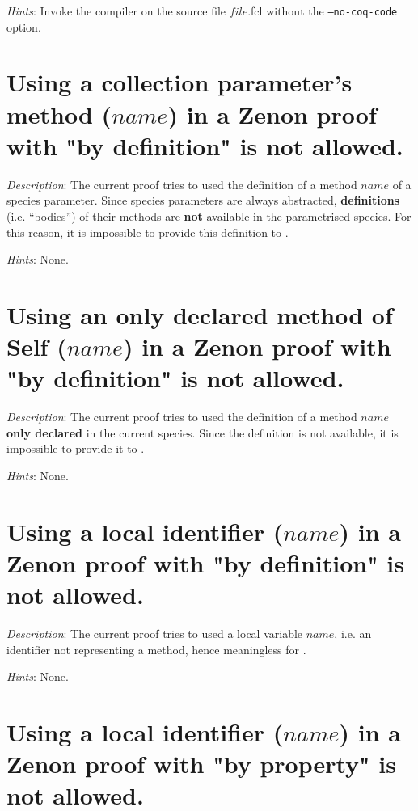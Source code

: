 {\em Hints}: Invoke the compiler on the source file $file$.fcl without
the {\tt --no-coq-code} option.



\section*{Using a collection parameter's method ($name$) in a Zenon proof
  with "by definition" is not allowed.}

{\em Description}: The current proof tries to used the definition of a
method $name$ of a species parameter. Since species parameters are
always abstracted, {\bf definitions} (i.e. ``bodies'') of their methods
are {\bf not} available in the parametrised species. For this reason,
it is impossible to provide this definition to {\zenon}.

{\em Hints}: None.



\section*{Using an only declared method of Self ($name$) in a Zenon
  proof with "by definition" is not allowed.}

{\em Description}: The current proof tries to used the definition of a
method $name$ {\bf only declared} in the current species. Since the
definition is not available, it is impossible to provide it to
{\zenon}.

{\em Hints}: None.



\section*{Using a local identifier ($name$) in a Zenon proof with "by
  definition" is not allowed.}

{\em Description}: The current proof tries to used a local variable
$name$, i.e. an identifier not representing a method, hence
meaningless for {\zenon}.

{\em Hints}: None.



\section*{Using a local identifier ($name$) in a Zenon proof with "by
  property" is not allowed.}


